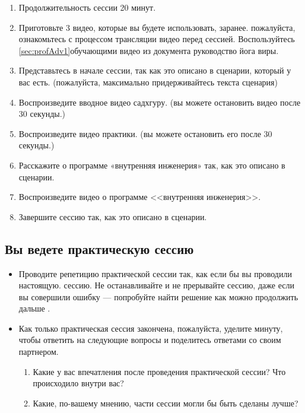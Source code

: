 \documentclass[
a4paper, %
12pt, %
article,
onecolumn, %
openany, %
]{memoir}
\begin{document}
\begin{enumerate}
\item Продолжительность сессии 20 минут.
\item Приготовьте 3 видео, которые вы будете использовать, заранее. пожалуйста, ознакомьтесь с процессом трансляции видео перед сессией. Воспользуйтесь \ref{sec:profAdv1}{обучающими видео} из документа руководство йога виры.
\item Представьтесь в начале сессии, так как это описано в сценарии, который у вас есть.
(пожалуйста, максимально придерживайтесь текста сценария)
\item Воспроизведите вводное видео садхгуру. (вы можете остановить видео после 30
секунды.)
\item Воспроизведите видео практики. (вы можете остановить его после 30 секунды.)
\item Расскажите о программе «внутренняя инженерия» так, как это описано в сценарии.
\item Воспроизведите видео о программе <<внутренняя инженерия>>.
\item Завершите сессию так, как это описано в сценарии.
\end{enumerate}


\subsection*{Вы ведете практическую сессию}
\begin{itemize}
\item Проводите репетицию практической сессии так, как если бы вы проводили настоящую.
сессию. Не останавливайте и не прерывайте сессию, даже если вы совершили ошибку —
попробуйте найти решение как можно продолжить дальше \faSmileO.
\item Как только практическая сессия закончена, пожалуйста, уделите минуту, чтобы ответить на следующие вопросы и поделитесь ответами со своим партнером.
\begin{enumerate}
\item Какие у вас впечатления после проведения практической сессии? Что происходило
внутри вас?
\item Какие, по-вашему мнению, части сессии могли бы быть сделаны лучше?
\end{enumerate} 
\end{itemize}
\end{document}
